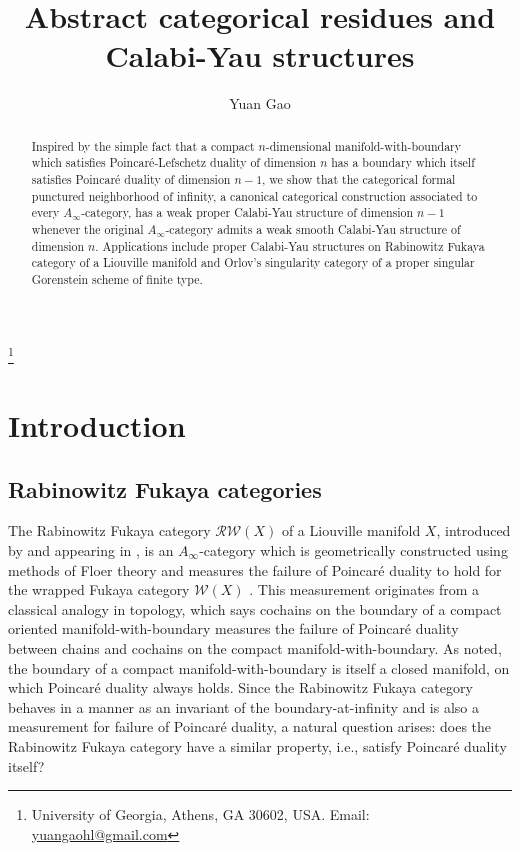 \documentclass[11pt]{amsproc}
\def\w{\mathcal{W}(E)}
\def\w{\mathcal{W}}
\def\rw{\mathcal{RW}}
\def\ainf{A_\infty}
\theoremstyle{remark}
\numberwithin{equation}{section}
\begin{document}
\begin{abstract}
Inspired by the simple fact that a compact $n$-dimensional manifold-with-boundary which satisfies Poincar\'{e}-Lefschetz duality of dimension $n$ has a boundary which itself satisfies Poincar\'{e} duality of dimension $n-1$,
we show that the categorical formal punctured neighborhood of infinity,
a canonical categorical construction associated to every $\ainf$-category,
has a weak proper Calabi-Yau structure of dimension $n-1$ whenever the original $\ainf$-category admits a weak smooth Calabi-Yau structure of dimension $n$.
Applications include proper Calabi-Yau structures on Rabinowitz Fukaya category of a Liouville manifold and Orlov's singularity category of a proper singular Gorenstein scheme of finite type.
\end{abstract}

\title{Abstract categorical residues and Calabi-Yau structures}
\author{Yuan Gao} \thanks{University of Georgia, Athens, GA 30602, USA. Email: \url{yuangaohl@gmail.com}}
\address{Department of Mathematics, University of Georgia, Athens, GA 30602}

\maketitle
\tableofcontents

\section{Introduction}

\subsection{Rabinowitz Fukaya categories}

The Rabinowitz Fukaya category $\rw(X)$ of a Liouville manifold $X$,
introduced by \cite{GGV} and appearing in \cite{BJK},
 is an $\ainf$-category which is geometrically constructed using methods of Floer theory and measures the failure of Poincar\'{e} duality to hold for the wrapped Fukaya category $\w(X)$ \cites{abouzaid-seidel, abouzaid_gc, ganatra}.
This measurement originates from a classical analogy in topology, 
which says cochains on the boundary of a compact oriented manifold-with-boundary measures the failure of Poincar\'{e} duality between chains and cochains on the compact manifold-with-boundary.
As noted, the boundary of a compact manifold-with-boundary is itself a closed manifold,
on which Poincar\'{e} duality always holds.
Since the Rabinowitz Fukaya category behaves in a manner as an invariant of the boundary-at-infinity and is also a measurement for failure of Poincar\'{e} duality,
 a natural question arises: does the Rabinowitz Fukaya category have a similar property, i.e., satisfy Poincar\'{e} duality itself?
\end{document}
